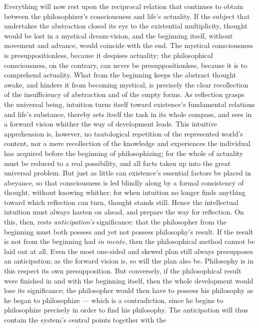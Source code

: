\documentclass[12pt]{book}
\begin{document}
Everything will now rest upon the reciprocal relation that continues to
obtain between the philosophizer's consciousness and life's actuality. If
the subject that undertakes the abstraction closed its eye to the
existential multiplicity, thought would be lost in a mystical dream-vision,
and the beginning itself, without movement and advance, would coincide with
the end. The mystical consciousness is presuppositionless, because it
despises actuality; the philosophical consciousness, on the contrary, can
never be presuppositionless, because it is to comprehend actuality. What
from the beginning keeps the abstract thought awake, and hinders it from
becoming mystical, is precisely the clear recollection of the insufficiency
of abstraction and of the empty forms. As reflection grasps the universal
being, intuition turns itself toward existence's fundamental relations and
life's substance, thereby sets itself the task in its whole compass, and
sees in a forward vision whither the way of development leads. This
intuitive apprehension is, however, no tautological repetition of the
represented world's content, nor a mere recollection of the knowledge and
experiences the individual has acquired before the beginning of
philosophizing; for the whole of actuality must be reduced to a real
possibility, and all facts taken up into the great universal problem. But
just as little can existence's essential factors be placed in abeyance, so
that consciousness is led blindly along by a formal consistency of thought,
without knowing whither; for when intuition no longer finds anything toward
which reflection can turn, thought stands still. Hence the intellectual
intuition must always hasten on ahead, and prepare the way for reflection.
On this, then, rests \emph{anticipation's} significance: that the
philosopher from the beginning must both possess and yet not possess
philosophy's result. If the result is not from the beginning had \textit{in
mente}, then the philosophical method cannot be laid out at all. Even the
most one-sided and skewed plan still always presupposes an anticipation; as
the forward vision is, so will the plan also be. Philosophy is in this
respect its own presupposition. But conversely, if the philosophical result
were finished in and with the beginning itself, then the whole development
would lose its significance; the philosopher would then have to possess his
philosophy as he began to philosophize --- which is a contradiction, since
he begins to philosophize precisely in order to find his philosophy. The
anticipation will thus contain the system's central points together with the
\end{document}
